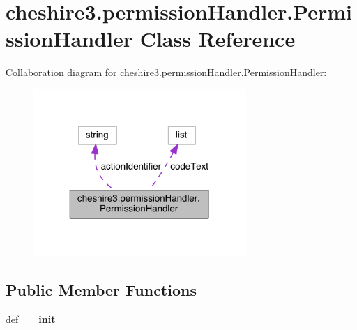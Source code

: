 \hypertarget{classcheshire3_1_1permission_handler_1_1_permission_handler}{\section{cheshire3.\-permission\-Handler.\-Permission\-Handler Class Reference}
\label{classcheshire3_1_1permission_handler_1_1_permission_handler}
}


Collaboration diagram for cheshire3.\-permission\-Handler.\-Permission\-Handler\-:
\nopagebreak
\begin{figure}[H]
\begin{center}
\leavevmode
\includegraphics[width=229pt]{classcheshire3_1_1permission_handler_1_1_permission_handler__coll__graph}
\end{center}
\end{figure}
\subsection*{Public Member Functions}
\begin{DoxyCompactItemize}
\item 
\hypertarget{classcheshire3_1_1permission_handler_1_1_permission_handler_a46f14c6268716d392c6395bbaefbde48}{def {\bfseries \-\_\-\-\_\-init\-\_\-\-\_\-}}\label{classcheshire3_1_1permission_handler_1_1_permission_handler_a46f14c6268716d392c6395bbaefbde48}

\end{DoxyCompactItemize}
